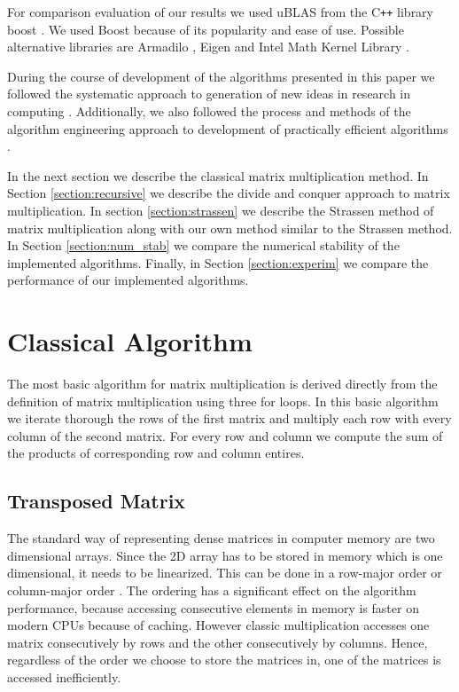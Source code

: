 \documentclass[a4paper,11pt]{article}
\newcommand{\cpp}{C\texttt{++} }
\begin{document}
For comparison evaluation of our results we used uBLAS from the \cpp library boost \cite{boost}. We used Boost because of its popularity and ease of use.
Possible alternative libraries are Armadilo \cite{armadillo}, Eigen \cite{eigen} and Intel Math Kernel Library \cite{mkl}.

During the course of development of the algorithms presented in this paper we followed the systematic approach to generation of new ideas in research in computing \cite{blagojevic}. Additionally, we also followed the process and methods of the algorithm engineering approach to development of practically efficient algorithms \cite{Muller10} \cite{McGeoch12} \cite{ExpAlgDF}.

In the next section we describe the classical matrix multiplication method. In Section \ref{section:recursive} we describe the divide and conquer approach to matrix multiplication. In section \ref{section:strassen} we describe the Strassen method of matrix multiplication along with our own method similar to the Strassen method. In Section \ref{section:num_stab} we compare the numerical stability of the implemented algorithms. Finally, in Section \ref{section:experim} we compare the performance of our implemented algorithms.

\section{Classical Algorithm}
\label{section:classic}
The most basic algorithm for matrix multiplication is derived directly from the definition of matrix multiplication using three for loops.
In this basic algorithm we iterate thorough the rows of the first matrix and multiply each row with every column of the second matrix. For every row and column we compute the sum of the products of corresponding row and column entires.

\subsection{Transposed Matrix}
\label{classic_transposed}
The standard way of representing dense matrices in computer memory are two dimensional arrays. Since the 2D array has to be stored in memory which is one dimensional, it needs to be linearized. This can be done in a row-major order or column-major order \cite{Knuth1997}. The ordering has a significant effect on the algorithm performance, because accessing consecutive elements in memory is faster on modern CPUs because of caching. However classic multiplication accesses one matrix consecutively by rows and the other consecutively by columns. Hence, regardless of the order we choose to store the matrices in, one of the matrices is accessed inefficiently.
\end{document}
